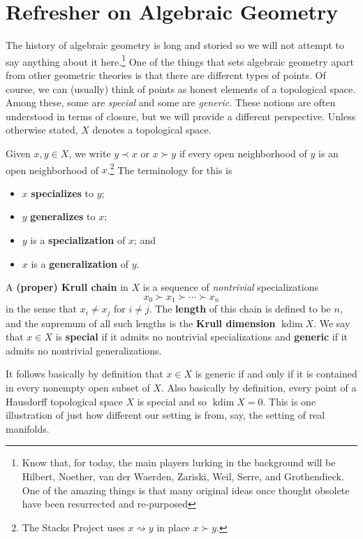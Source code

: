 \documentclass[11pt]{article}
\DeclareMathOperator{\kdim}{kdim} %
\begin{document}
\section{Refresher on Algebraic Geometry}
The history of algebraic geometry is long and storied so we will not attempt to say anything about it here.\footnote{Know that, for today, the main players lurking in the background will be Hilbert, Noether, van der Waerden, Zariski, Weil, Serre, and Grothendieck. One of the amazing things is that many original ideas once thought obsolete have been resurrected and re-purposed} One of the things that sets algebraic geometry apart from other geometric theories is that there are different types of points. Of course, we can (usually) think of points as honest elements of a topological space. Among these, some are \emph{special} and some are \emph{generic}. These notions are often understood in terms of closure, but we will provide a different perspective. Unless otherwise stated, $X$ denotes a topological space.

\begin{definition}
Given $x,y\in X$, we write $y\prec x$ or $x\succ y$ if every open neighborhood of $y$ is an open neighborhood of $x$.\footnote{The Stacks Project uses $x\rightsquigarrow y$ in place $x\succ y$.} The terminology for this is
\begin{itemize}
\item $x$ \textbf{specializes} to $y$;
\item $y$ \textbf{generalizes} to $x$;
\item $y$ is a \textbf{specialization} of $x$; and
\item $x$ is a \textbf{generalization} of $y$.
\end{itemize}
A \textbf{(proper) Krull chain} in $X$ is a sequence of \emph{nontrivial} specializations
$$x_0\succ x_1\succ\cdots\succ x_n$$
in the sense that $x_i\neq x_j$ for $i\neq j$. The \textbf{length} of this chain is defined to be $n$, and the supremum of all such lengths is the \textbf{Krull dimension} $\kdim X$. We say that $x\in X$ is \textbf{special} if it admits no nontrivial specializations and \textbf{generic} if it admits no nontrivial generalizations.
\end{definition}

It follows basically by definition that $x\in X$ is generic if and only if it is contained in every nonempty open subset of $X$. Also basically by definition, every point of a Hausdorff topological space $X$ is special and so $\kdim X=0$. This is one illustration of just how different our setting is from, say, the setting of real manifolds.
\end{document}
